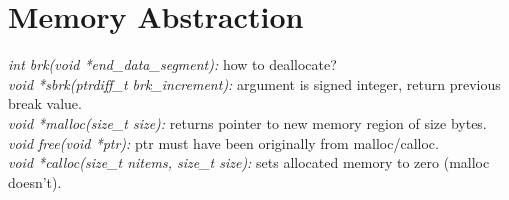 \section{Memory Abstraction}
\emph{int brk(void *end\_data\_segment):} how to deallocate?\\
\emph{void *sbrk(ptrdiff\_t brk\_increment):} argument is signed integer, return previous break value.\\
\emph{void *malloc(size\_t size):} returns pointer to new memory region of size bytes.\\
\emph{void free(void *ptr):} ptr must have been originally from malloc/calloc.\\
\emph{void *calloc(size\_t nitems, size\_t size):} sets allocated memory to zero (malloc doesn't).
